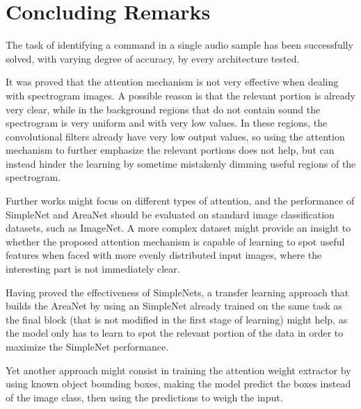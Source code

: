 
\section{Concluding Remarks}
\label{sec:conclusions}

The task of identifying a command in a single audio sample has been successfully
solved, with varying degree of accuracy, by every architecture tested.

%
It was proved that the attention mechanism is not very effective when dealing
with spectrogram images.
%
A possible reason is that the relevant portion is already very clear, while in
the background regions that do not contain sound the spectrogram is very
uniform and with very low values.
%
In these regions, the convolutional filters already have very low output
values, so using the attention mechanism to further emphasize the relevant
portions does not help, but can instead hinder the learning by sometime
mistakenly dimming useful regions of the spectrogram.

Further works might focus on different types of attention, and the performance
of SimpleNet and AreaNet should be evaluated on standard image classification
datasets, such as ImageNet.
%
A more complex dataset might provide an insight to whether the proposed
attention mechanism is capable of learning to spot useful features when faced
with more evenly distributed input images, where the interesting part is not
immediately clear.

%
Having proved the effectiveness of SimpleNets, a transfer learning approach
that builds the AreaNet by using an SimpleNet already trained on the same task
as the final block (that is not modified in the first stage of learning) might
help, as the model only has to learn to spot the relevant portion of the data
in order to maximize the SimpleNet performance.

Yet another approach might consist in training the attention weight extractor
by using known object bounding boxes, making the model predict the boxes
instead of the image class, then using the predictions to weigh the input.


